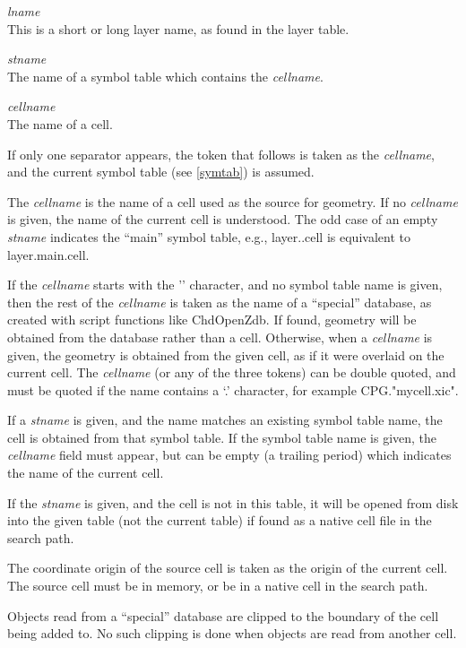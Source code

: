 \begin{description}
\item{\it lname}\\
This is a short or long layer name, as found in the layer table.
\item{\it stname}\\
The name of a symbol table which contains the {\it cellname}.
\item{\it cellname}\\
The name of a cell.
\end{description}

If only one separator appears, the token that follows is taken as the
{\it cellname}, and the current symbol table (see \ref{symtab}) is
assumed.

The {\it cellname} is the name of a cell used as the source for
geometry.  If no {\it cellname} is given, the name of the current cell
is understood.  The odd case of an empty {\it stname} indicates the
``{\vt main}'' symbol table, e.g., {\vt layer..cell} is equivalent to
{\vt layer.main.cell}.

If the {\it cellname} starts with the '{\vt \@}' character, and no
symbol table name is given, then the rest of the {\it cellname} is
taken as the name of a ``special'' database, as created with script
functions like {\vt ChdOpenZdb}.  If found, geometry will be obtained
from the database rather than a cell.  Otherwise, when a {\it
cellname} is given, the geometry is obtained from the given cell, as
if it were overlaid on the current cell.  The {\it cellname} (or any
of the three tokens) can be double quoted, and must be quoted if the
name contains a `{\vt .}' character, for example {\vt
CPG."mycell.xic"}.

If a {\it stname} is given, and the name matches an existing symbol
table name, the cell is obtained from that symbol table.  If the
symbol table name is given, the {\it cellname} field must appear, but
can be empty (a trailing period) which indicates the name of the
current cell.

If the {\it stname} is given, and the cell is not in this table, it
will be opened from disk into the given table (not the current table)
if found as a native cell file in the search path.

The coordinate origin of the source cell is taken as the origin of the
current cell.  The source cell must be in memory, or be in a native
cell in the search path.

Objects read from a ``special'' database are clipped to the boundary
of the cell being added to.  No such clipping is done when objects are
read from another cell.

